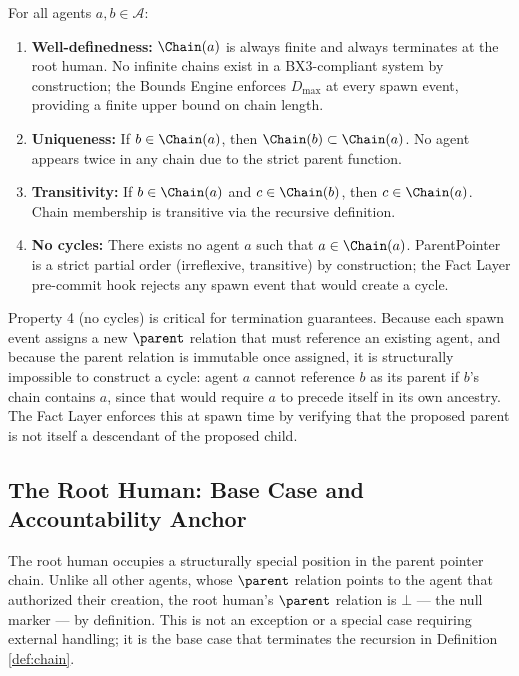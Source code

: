 \begin{property}
\label{prop:chain_properties}
For all agents $a, b \in \mathcal{A}$:
\begin{enumerate}
    \item \textbf{Well-definedness:} $\Chain(a)$ is always finite and always terminates at the root human. No infinite chains exist in a BX3-compliant system by construction; the Bounds Engine enforces $D_{\max}$ at every spawn event, providing a finite upper bound on chain length.

    \item \textbf{Uniqueness:} If $b \in \Chain(a)$, then $\Chain(b) \subset \Chain(a)$. No agent appears twice in any chain due to the strict parent function.

    \item \textbf{Transitivity:} If $b \in \Chain(a)$ and $c \in \Chain(b)$, then $c \in \Chain(a)$. Chain membership is transitive via the recursive definition.

    \item \textbf{No cycles:} There exists no agent $a$ such that $a \in \Chain(a)$. ParentPointer is a strict partial order (irreflexive, transitive) by construction; the Fact Layer pre-commit hook rejects any spawn event that would create a cycle.
\end{enumerate}
\end{property}

Property 4 (no cycles) is critical for termination guarantees. Because each spawn event assigns a new $\parent$ relation that must reference an existing agent, and because the parent relation is immutable once assigned, it is structurally impossible to construct a cycle: agent $a$ cannot reference $b$ as its parent if $b$'s chain contains $a$, since that would require $a$ to precede itself in its own ancestry. The Fact Layer enforces this at spawn time by verifying that the proposed parent is not itself a descendant of the proposed child.

\subsection{The Root Human: Base Case and Accountability Anchor}
\label{sec:root_human}

The root human occupies a structurally special position in the parent pointer chain. Unlike all other agents, whose $\parent$ relation points to the agent that authorized their creation, the root human's $\parent$ relation is $\bot$ — the null marker — by definition. This is not an exception or a special case requiring external handling; it is the base case that terminates the recursion in Definition \ref{def:chain}.

